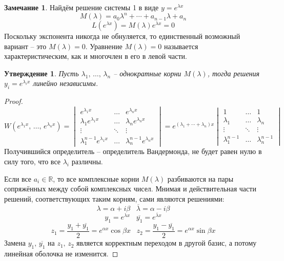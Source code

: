 \documentclass[a4paper,12pt]{article}
\theoremstyle{plain}
\newtheorem{proposition}{Утверждение}[section]
\theoremstyle{definition}
\newtheorem*{note}{Замечание}
\theoremstyle{remark}
\begin{document}
\begin{note}
	Найдём решение системы 1 в виде $y = e^{\lambda x}$
	\[M(\lambda) = a_0\lambda^n + \cdots + a_{n-1}\lambda + a_n\]
	\[L(e^{\lambda x}) = M(\lambda)e^{\lambda x} = 0\]
	Поскольку экспонента никогда не обнуляется, то единственный возможный вариант -- это $M(\lambda) = 0$. Уравнение $M(\lambda) = 0$ называется характеристическим, как и многочлен в его в левой части.
\end{note}

\begin{proposition}
	Пусть $\lambda_1,\,\ldots,\,\lambda_n$ -- однократные корни $M(\lambda)$, тогда решения $y_i = e^{\lambda_i x}$ линейно независимы.
\end{proposition}

\begin{proof}
	\[W(e^{\lambda_1 x},\,\ldots,\,e^{\lambda_n x}) = \begin{vmatrix}
			e^{\lambda_1 x}                & \ldots & e^{\lambda_n x}                \\
			\lambda_1e^{\lambda_1 x}       & \ldots & \lambda_ne^{\lambda_n x}       \\
			\vdots                         & \ddots & \vdots                         \\
			\lambda_1^{n-1}e^{\lambda_1 x} & \ldots & \lambda_n^{n-1}e^{\lambda_n x}
		\end{vmatrix} = e^{(\lambda_1 + \cdots + \lambda_n)x}\begin{vmatrix}
			1               & \ldots & 1               \\
			\lambda_1       & \ldots & \lambda_n       \\
			\vdots          & \ddots & \vdots          \\
			\lambda_1^{n-1} & \ldots & \lambda_n^{n-1}
		\end{vmatrix}\]
	Получившийся определитель -- определитель Вандермонда, не будет равен нулю в силу того, что все $\lambda_i$ различны.

	Если все $a_i \in \mathbb{R}$, то все комплексные корни $M(\lambda)$ разбиваются на пары сопряжённых между собой комплексных чисел. Мнимая и действительная части решений, соответствующих таким корням, сами являются решениями:
	\[\lambda = \alpha + i\beta\;\;\; \overline{\lambda} = \alpha - i\beta\]
	\[y_1 = e^{\lambda x}\;\;\; \overline{y_1} = e^{\overline{\lambda}x}\]
	\[z_1 = \frac{y_1 + \overline{y_1}}{2} = e^{\alpha x}\cos \beta x\;\;\; z_2 = \frac{y_1 - \overline{y_1}}{2} = e^{\alpha x}\sin \beta x\]
	Замена $y_1,\,\overline{y_1}$ на $z_1,\,z_2$ является корректным переходом в другой базис, а потому линейная оболочка не изменится.
\end{proof}
\end{document}
